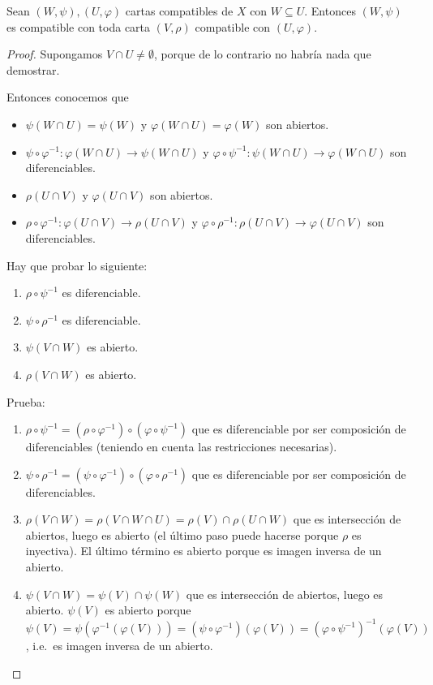 \documentclass[ebook,oneside]{memoir}
\numberwithin{equation}{chapter}
\begin{document}
\begin{lemma}
  \label{lem:compat-subcartas}
  Sean \((W,\psi), (U,\varphi)\) cartas compatibles de \(X\) con \(W \subseteq
  U\). Entonces \((W,\psi)\) es compatible con toda carta \((V,\rho)\)
  compatible con \((U,\varphi)\).
\end{lemma}

\begin{proof}
  Supongamos \(V \cap U \neq \emptyset\), porque de lo contrario no habría nada
  que demostrar.

  Entonces conocemos que
  \begin{itemize}
  \item \(\psi(W \cap U) = \psi(W)\) y \(\varphi(W \cap U) = \varphi(W)\) son
    abiertos.
  \item \(\psi \circ \varphi^{-1} \colon \varphi(W \cap U) \to \psi(W \cap U)\)
    y \(\varphi \circ \psi^{-1} \colon \psi(W \cap U) \to \varphi(W \cap U)\)
    son diferenciables.
  \item \(\rho(U \cap V)\) y \(\varphi(U \cap V)\) son abiertos.
  \item \(\rho \circ \varphi^{-1} \colon \varphi(U \cap V) \to \rho(U \cap V)\)
    y \(\varphi \circ \rho^{-1} \colon \rho(U \cap V) \to \varphi(U \cap V)\)
    son diferenciables.
  \end{itemize}

  Hay que probar lo siguiente:
  \begin{enumerate}
  \item \(\rho \circ \psi^{-1}\) es diferenciable.
  \item \(\psi \circ \rho^{-1}\) es diferenciable.
  \item \(\psi(V \cap W)\) es abierto.
  \item \(\rho(V \cap W)\) es abierto.
  \end{enumerate}

  Prueba:
  \begin{enumerate}
  \item \(\rho \circ \psi^{-1} = (\rho \circ \varphi^{-1}) \circ (\varphi \circ
    \psi^{-1})\) que es diferenciable por ser composición de diferenciables
    (teniendo en cuenta las restricciones necesarias).
  \item \(\psi \circ \rho^{-1} = (\psi \circ \varphi^{-1}) \circ (\varphi \circ
    \rho^{-1})\) que es diferenciable por ser composición de diferenciables.
  \item \(\rho(V \cap W) = \rho(V \cap W \cap U) = \rho(V) \cap \rho(U \cap W)\)
    que es intersección de abiertos, luego es abierto (el último paso puede
    hacerse porque \(\rho\) es inyectiva). El último término es abierto porque
    es imagen inversa de un abierto.
  \item \(\psi(V \cap W) = \psi(V) \cap \psi(W)\) que es intersección de
    abiertos, luego es abierto. \(\psi(V)\) es abierto porque \(\psi(V) =
    \psi{(\varphi^{-1}{(\varphi{(V)})})} = (\psi \circ \varphi^{-1}){(\varphi{(V)})} =
    {(\varphi \circ \psi^{-1})}^{-1}{(\varphi{(V)})}\), i.e.\ es imagen inversa de un abierto.
  \end{enumerate}
\end{proof}
\end{document}
